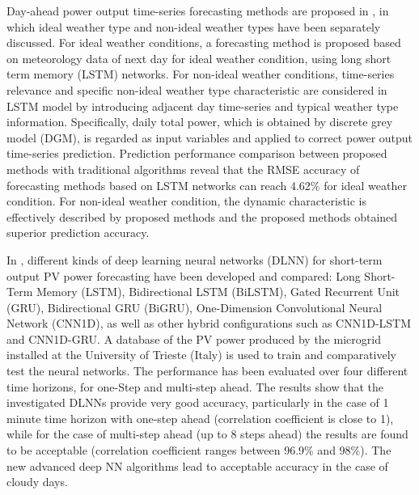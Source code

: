Day-ahead power output time-series forecasting methods are proposed in \cite{GAO2019115838}, in which ideal weather type and non-ideal weather types have been separately discussed.
For ideal weather conditions, a forecasting method is proposed based on meteorology data of next day for ideal weather condition, using long short term memory (LSTM) networks.
For non-ideal weather conditions, time-series relevance and specific non-ideal weather type characteristic are considered in LSTM model by introducing adjacent day time-series and typical weather type information.
Specifically, daily total power, which is obtained by discrete grey model (DGM), is regarded as input variables and applied to correct power output time-series prediction.
Prediction performance comparison between proposed methods with traditional algorithms reveal that the RMSE accuracy of forecasting methods based on LSTM networks can reach 4.62\% for ideal weather condition.
For non-ideal weather condition, the dynamic characteristic is effectively described by proposed methods and the proposed methods obtained superior prediction accuracy.

In \cite{MELLIT2021276}, different kinds of deep learning neural networks (DLNN) for short-term output PV power forecasting have been developed and compared: Long Short-Term Memory (LSTM), Bidirectional LSTM (BiLSTM), Gated Recurrent Unit (GRU), Bidirectional GRU (BiGRU), One-Dimension Convolutional Neural Network (CNN1D), as well as other hybrid configurations such as CNN1D-LSTM and CNN1D-GRU.
A database of the PV power produced by the microgrid installed at the University of Trieste (Italy) is used to train and comparatively test the neural networks.
The performance has been evaluated over four different time horizons, for one-Step and multi-step ahead.
The results show that the investigated DLNNs provide very good accuracy, particularly in the case of 1 minute time horizon with one-step ahead (correlation coefficient is close to 1), while for the case of multi-step ahead (up to 8 steps ahead) the results are found to be acceptable (correlation coefficient ranges between 96.9\% and 98\%).
The new advanced deep NN algorithms lead to acceptable accuracy in the case of cloudy days.

